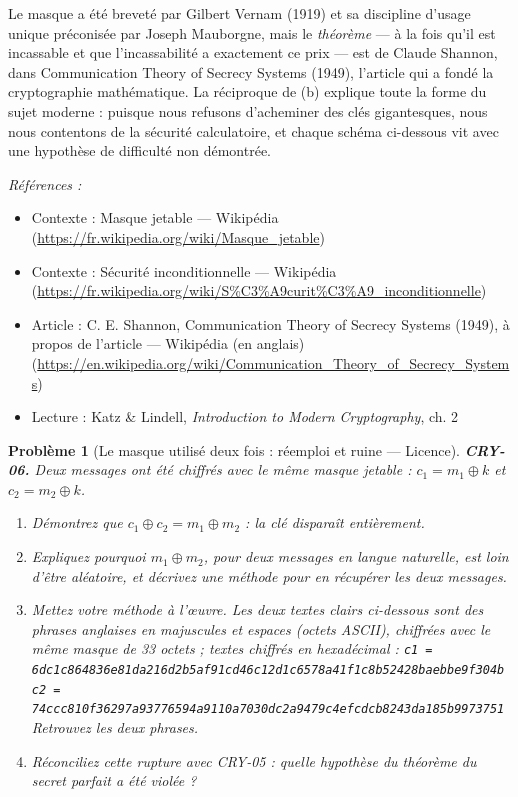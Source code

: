 \documentclass[11pt]{article}
\newtheorem{problem}{Problème}
\newenvironment{refs}{\par\small\noindent\emph{Références :}\begin{itemize}\setlength\itemsep{0pt}}{\end{itemize}\normalsize}
\begin{document}
\noindent Le masque a été breveté par Gilbert Vernam (1919) et sa discipline
d'usage unique préconisée par Joseph Mauborgne, mais le \textit{théorème} --- à la fois qu'il est
incassable et que l'incassabilité a exactement ce prix --- est de Claude Shannon, dans
\og{} Communication Theory of Secrecy Systems \fg{} (1949), l'article qui a fondé la cryptographie
mathématique. La réciproque de (b) explique toute la forme du sujet moderne : puisque nous
refusons d'acheminer des clés gigantesques, nous nous contentons de la sécurité
calculatoire, et chaque schéma ci-dessous vit avec une hypothèse de difficulté non
démontrée.

\begin{refs}
\item Contexte : Masque jetable --- Wikipédia (\url{https://fr.wikipedia.org/wiki/Masque_jetable})
\item Contexte : Sécurité inconditionnelle --- Wikipédia (\url{https://fr.wikipedia.org/wiki/S%C3%A9curit%C3%A9_inconditionnelle})
\item Article : C. E. Shannon, \og{} Communication Theory of Secrecy Systems \fg{} (1949), à propos de l'article --- Wikipédia (en anglais) (\url{https://en.wikipedia.org/wiki/Communication_Theory_of_Secrecy_Systems})
\item Lecture : Katz \& Lindell, \textit{Introduction to Modern Cryptography}, ch. 2
\end{refs}

\bigskip

\begin{problem}[{Le masque utilisé deux fois : réemploi et ruine --- Licence}]
\textbf{CRY-06.} Deux messages ont été chiffrés avec le
\textit{même} masque jetable : $c_1 = m_1 \oplus k$ et $c_2 = m_2 \oplus k$.
\begin{enumerate}
\item[(a)] Démontrez que $c_1 \oplus c_2 = m_1 \oplus m_2$ : la clé disparaît entièrement.
\item[(b)] Expliquez pourquoi $m_1 \oplus m_2$, pour deux messages en langue naturelle, est loin
d'être aléatoire, et décrivez une méthode pour en récupérer les deux messages.
\item[(c)] Mettez votre
méthode à l'\oe{}uvre. Les deux textes clairs ci-dessous sont des phrases anglaises en
majuscules et espaces (octets ASCII), chiffrées avec le même masque de 33 octets ; textes
chiffrés en hexadécimal : 
\texttt{c1 = 6dc1c864836e81da216d2b5af91cd46c12d1c6578a41f1c8b52428baebbe9f304b} 
\texttt{c2 = 74ccc810f36297a93776594a9110a7030dc2a9479c4efcdcb8243da185b9973751} 
Retrouvez les deux phrases.
\item[(d)] Réconciliez cette rupture avec CRY-05 : quelle hypothèse
du théorème du secret parfait a été violée ?
\end{enumerate}

\end{problem}
\end{document}
